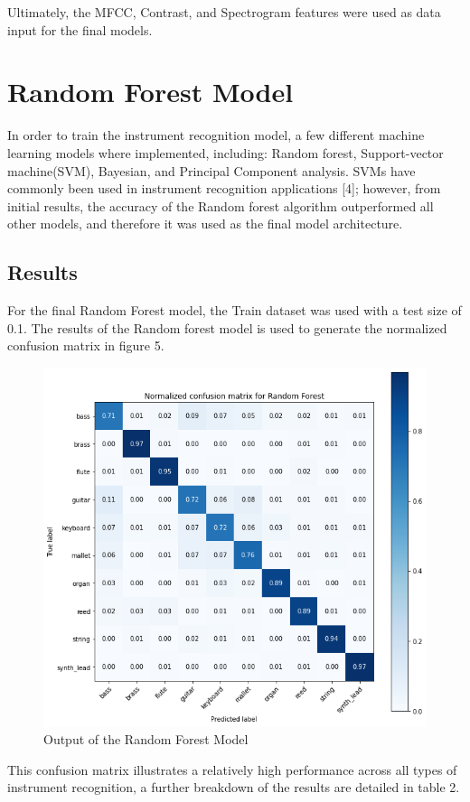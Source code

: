 \documentclass{article}
\begin{document}
Ultimately, the MFCC, Contrast, and Spectrogram features were used as data input for the final models.

\section{Random Forest Model}

In order to train the instrument recognition model, a few different machine learning models where implemented, including: Random forest, Support-vector machine(SVM), Bayesian, and Principal Component analysis. SVMs have commonly been used in instrument recognition applications [4]; however, from initial results, the accuracy of the Random forest algorithm outperformed all other models, and therefore it was used as the final model architecture. 

\subsection{Results}
For the final Random Forest model, the Train dataset was used with a test size of 0.1. The results of the Random forest model is used to generate the normalized confusion matrix in figure 5.

\begin{figure}[htb]
  \centering
  \includegraphics[width=.6\linewidth]{confusion_matrix}
  \caption{Output of the Random Forest Model}
\end{figure}

This confusion matrix illustrates a relatively high performance across all types of instrument recognition, a further breakdown of the results are detailed in table 2. 
\end{document}
